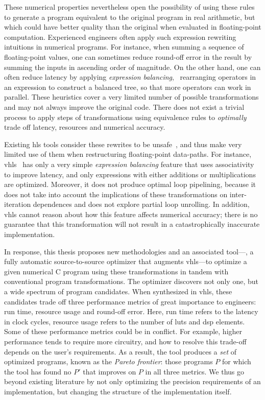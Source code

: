 These numerical properties nevertheless open the possibility of using these
rules to generate a program equivalent to the original program in real
arithmetic, but which could have better quality than the original when
evaluated in floating-point computation.  Experienced engineers often apply
such expression rewriting intuitions in numerical programs.  For instance, when
summing a sequence of floating-point values, one can sometimes reduce round-off
error in the result by summing the inputs in ascending order of magnitude.
On the other hand, one can often reduce latency by applying \emph{expression
balancing}, \ie~rearranging operators in an expression to construct a balanced
tree, so that more operators can work in parallel.  These heuristics cover a
very limited number of possible transformations and may not always improve
the original code.  There does not exist a trivial process to apply steps of
transformations using equivalence rules to \emph{optimally} trade off latency,
resources and numerical accuracy.

Existing \gls{hls} tools consider these rewrites to be
unsafe~\cite{vivado_hls}, and thus make very limited use of them
when restructuring floating-point data-paths.  For instance,
\gls{vhls}~\cite{vivado_hls} has only a very simple \emph{expression balancing}
feature that uses associativity to improve latency, and only expressions with
either additions or multiplications are optimized.  Moreover, it does not
produce optimal loop pipelining, because it does not take into account the
implications of these transformations on inter-iteration dependences and does
not explore partial loop unrolling.  In addition, \gls{vhls} cannot reason
about how this feature affects numerical accuracy; there is no guarantee
that this transformation will not result in a catastrophically inaccurate
implementation.

In response, this thesis proposes new methodologies and an associated
tool---\soap, a fully automatic source-to-source optimizer that augments
\gls{vhls}---to optimize a given numerical C program using these
transformations in tandem with conventional program transformations.  The
optimizer discovers not only one, but a wide spectrum of program candidates.
When synthesized in \gls{vhls}, these candidates trade off three performance
metrics of great importance to engineers: run time, resource usage and
round-off error.  Here, run time refers to the latency in clock cycles,
resource usage refers to the number of \glspl{lut} and \gls{dsp} elements.
Some of these performance metrics could be in conflict.  For example, higher
performance tends to require more circuitry, and how to resolve this trade-off
depends on the user's requirements.  As a result, the tool produces a
\emph{set} of optimized programs, known as the \emph{Pareto frontier}: those
programs $P$ for which the tool has found no $P'$ that improves on $P$ in all
three metrics.  We thus go beyond existing literature by not only optimizing
the precision requirements of an implementation, but changing the structure of
the implementation itself.


